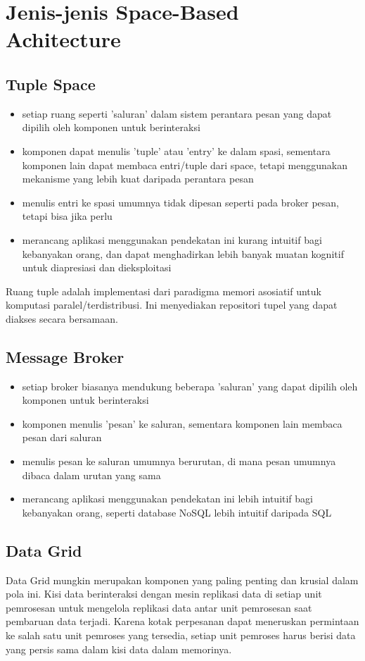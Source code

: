 \documentclass[a4paper]{report}
\begin{document}
	\section*{\huge{Jenis-jenis Space-Based Achitecture}}
	\subsection*{\LARGE{Tuple Space}}
	\begin{itemize}
		\item \large setiap ruang seperti 'saluran' dalam sistem perantara pesan yang dapat dipilih oleh komponen untuk berinteraksi
		\item \large komponen dapat menulis 'tuple' atau 'entry' ke dalam spasi, sementara komponen lain dapat membaca entri/tuple dari space, tetapi menggunakan mekanisme yang lebih kuat daripada perantara pesan
		\item \large menulis entri ke spasi umumnya tidak dipesan seperti pada broker pesan, tetapi bisa jika perlu
		\item \large merancang aplikasi menggunakan pendekatan ini kurang intuitif bagi kebanyakan orang, dan dapat menghadirkan lebih banyak muatan kognitif untuk diapresiasi dan dieksploitasi
	\end{itemize}
	\large Ruang tuple adalah implementasi dari paradigma memori asosiatif untuk komputasi paralel/terdistribusi. Ini menyediakan repositori tupel yang dapat diakses secara bersamaan.
	\subsection*{\LARGE{Message Broker}}
	\begin{itemize}
		\item \large setiap broker biasanya mendukung beberapa 'saluran' yang dapat dipilih oleh komponen untuk berinteraksi
		\item \large komponen menulis 'pesan' ke saluran, sementara komponen lain membaca pesan dari saluran
		\item \large menulis pesan ke saluran umumnya berurutan, di mana pesan umumnya dibaca dalam urutan yang sama
		\item \large merancang aplikasi menggunakan pendekatan ini lebih intuitif bagi kebanyakan orang, seperti database NoSQL lebih intuitif daripada SQL
	\end{itemize}
	\subsection*{\LARGE{Data Grid}}
	\large Data Grid mungkin merupakan komponen yang paling penting dan krusial dalam pola ini. Kisi data berinteraksi dengan mesin replikasi data di setiap unit pemrosesan untuk mengelola replikasi data antar unit pemrosesan saat pembaruan data terjadi. Karena kotak perpesanan dapat meneruskan permintaan ke salah satu unit pemroses yang tersedia, setiap unit pemroses harus berisi data yang persis sama dalam kisi data dalam memorinya.
\end{document}
